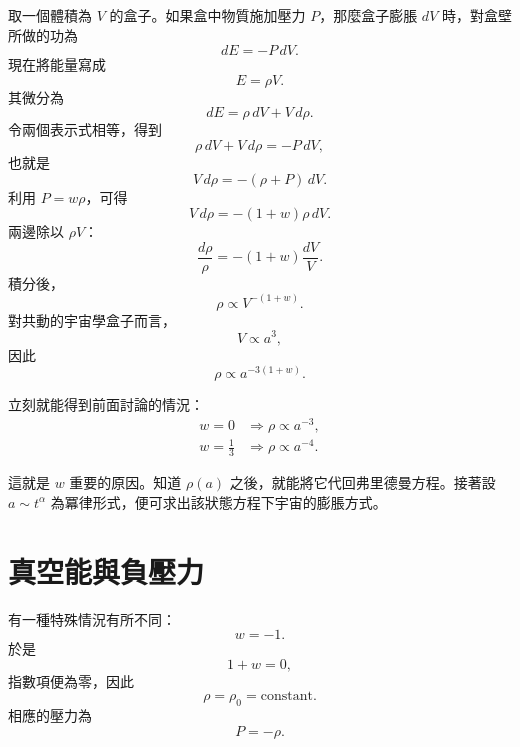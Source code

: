 取一個體積為 \(V\) 的盒子。如果盒中物質施加壓力 \(P\)，那麼盒子膨脹 \(dV\) 時，對盒壁所做的功為
\begin{equation}
dE=-P\,dV.
\end{equation}
現在將能量寫成
\begin{equation}
E=\rho V.
\end{equation}
其微分為
\begin{equation}
dE=\rho\,dV+V\,d\rho .
\end{equation}
令兩個表示式相等，得到
\begin{equation}
\rho\,dV+V\,d\rho=-P\,dV,
\end{equation}
也就是
\begin{equation}
V\,d\rho=-(\rho+P)\,dV.
\end{equation}
利用 \(P=w\rho\)，可得
\begin{equation}
V\,d\rho=-(1+w)\rho\,dV.
\end{equation}
兩邊除以 \(\rho V\)：
\begin{equation}
\frac{d\rho}{\rho}=-(1+w)\frac{dV}{V}.
\end{equation}
積分後，
\begin{equation}
\rho \propto V^{-(1+w)}.
\end{equation}
對共動的宇宙學盒子而言，
\begin{equation}
V\propto a^3,
\end{equation}
因此
\begin{equation}
\rho \propto a^{-3(1+w)}.
\end{equation}

立刻就能得到前面討論的情況：
\begin{align}
w=0 &\Longrightarrow \rho \propto a^{-3},\\
w=\frac{1}{3} &\Longrightarrow \rho \propto a^{-4}.
\end{align}

這就是 \(w\) 重要的原因。知道 \(\rho(a)\) 之後，就能將它代回弗里德曼方程。接著設 \(a\sim t^\alpha\) 為冪律形式，便可求出該狀態方程下宇宙的膨脹方式。

\section{真空能與負壓力}

有一種特殊情況有所不同：
\begin{equation}
w=-1.
\end{equation}
於是
\begin{equation}
1+w=0,
\end{equation}
指數項便為零，因此
\begin{equation}
\rho=\rho_0=\text{constant}.
\end{equation}
相應的壓力為
\begin{equation}
P=-\rho .
\end{equation}

